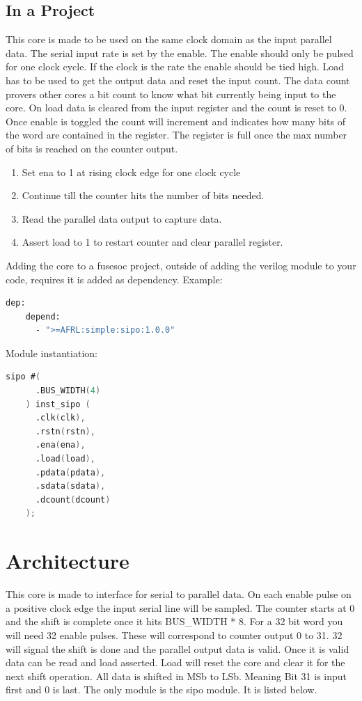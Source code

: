 

\subsection{In a Project}
\par
This core is made to be used on the same clock domain as the input parallel data. The serial input rate is set by the enable.
The enable should only be pulsed for one clock cycle. If the clock is the rate the enable should be tied high. Load has to be
used to get the output data and reset the input count. The data count provers other cores a bit count to know what bit currently being
input to the core. On load data is cleared from the input register and the count is reset to 0. Once enable is toggled the count
will increment and indicates how many bits of the word are contained in the register. The register is full once the max number
of bits is reached on the counter output.
\begin{enumerate}
  \item Set ena to 1 at rising clock edge for one clock cycle
  \item Continue till the counter hits the number of bits needed.
  \item Read the parallel data output to capture data.
  \item Assert load to 1 to restart counter and clear parallel register.
\end{enumerate}

Adding the core to a fusesoc project, outside of adding the verilog module to your code, requires it is added as dependency.
Example:
\begin{lstlisting}[language=bash]
  dep:
    depend:
      - ">=AFRL:simple:sipo:1.0.0"
\end{lstlisting}

Module instantiation:
\begin{lstlisting}[language=Verilog]
    sipo #(
      .BUS_WIDTH(4)
    ) inst_sipo (
      .clk(clk),
      .rstn(rstn),
      .ena(ena),
      .load(load),
      .pdata(pdata),
      .sdata(sdata),
      .dcount(dcount)
    );
\end{lstlisting}

\section{Architecture}
\par
This core is made to interface for serial to parallel data. On each enable pulse on a positive clock edge the input serial
line will be sampled. The counter starts at 0 and the shift is complete once it hits BUS\_WIDTH * 8. For a 32 bit word you will
need 32 enable pulses. These will correspond to counter output 0 to 31. 32 will signal the shift is done and the parallel output
data is valid. Once it is valid data can be read and load asserted. Load will reset the core and clear it for the next shift operation.
All data is shifted in MSb to LSb. Meaning Bit 31 is input first and 0 is last.
The only module is the sipo module. It is listed below.

